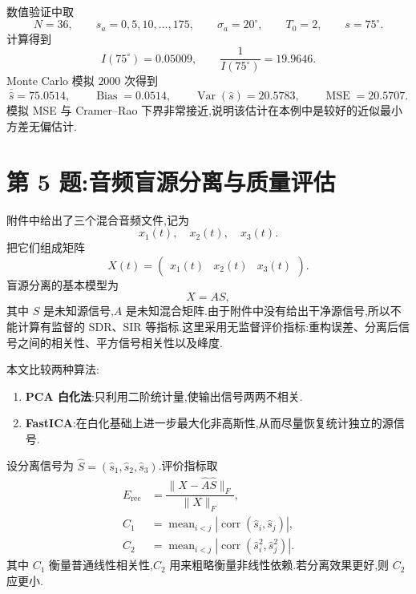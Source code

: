 \documentclass[oneside]{ctexart}
\begin{document}
数值验证中取
\[
    N=36,
    \qquad s_a=0,5,10,\ldots,175,
    \qquad \sigma_a=20^\circ,
    \qquad T_0=2,
    \qquad s=75^\circ.
\]
计算得到
\begin{equation}
    I(75^\circ)=0.05009,
    \qquad
    \dfrac{1}{I(75^\circ)}=19.9646.
\end{equation}
Monte Carlo 模拟 $2000$ 次得到
\begin{equation}
    \overline{\hat s}=75.0514,
    \qquad
    \operatorname{Bias}=0.0514,
    \qquad
    \operatorname{Var}(\hat s)=20.5783,
    \qquad
    \operatorname{MSE}=20.5707.
\end{equation}
模拟 MSE 与 Cramer--Rao 下界非常接近,说明该估计在本例中是较好的近似最小方差无偏估计.

\section{第 5 题:音频盲源分离与质量评估}

附件中给出了三个混合音频文件,记为
\[
    x_1(t),\quad x_2(t),\quad x_3(t).
\]
把它们组成矩阵
\[
    X(t)=\begin{pmatrix}x_1(t) & x_2(t) & x_3(t)\end{pmatrix}.
\]
盲源分离的基本模型为
\begin{equation}
    X=AS,
\end{equation}
其中 $S$ 是未知源信号,$A$ 是未知混合矩阵.由于附件中没有给出干净源信号,所以不能计算有监督的 SDR、SIR 等指标.这里采用无监督评价指标:重构误差、分离后信号之间的相关性、平方信号相关性以及峰度.

本文比较两种算法:

\begin{enumerate}
    \item \textbf{PCA 白化法}:只利用二阶统计量,使输出信号两两不相关.
    \item \textbf{FastICA}:在白化基础上进一步最大化非高斯性,从而尽量恢复统计独立的源信号.
\end{enumerate}

设分离信号为 $\hat S=(\hat s_1,\hat s_2,\hat s_3)$.评价指标取
\begin{align}
    E_{\mathrm{rec}}&=\dfrac{\|X-\hat A\hat S\|_F}{\|X\|_F},\\
    C_1&=\operatorname{mean}_{i<j}|\operatorname{corr}(\hat s_i,\hat s_j)|,\\
    C_2&=\operatorname{mean}_{i<j}|\operatorname{corr}(\hat s_i^2,\hat s_j^2)|.
\end{align}
其中 $C_1$ 衡量普通线性相关性,$C_2$ 用来粗略衡量非线性依赖.若分离效果更好,则 $C_2$ 应更小.
\end{document}
